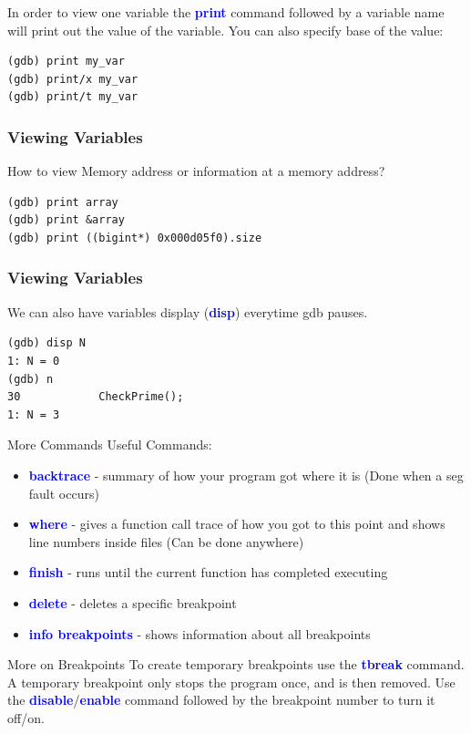 \documentclass[11pt]{beamer}
\begin{document}
\begin{frame}[fragile]
In order to view one variable the \textbf{\textcolor{blue}{print}} command followed by a variable name will print out the value of the variable. You can also specify base of the value:

\begin{lstlisting}[style=BashInputStyle]
(gdb) print my_var
(gdb) print/x my_var
(gdb) print/t my_var
\end{lstlisting}
\end{frame}

\begin{frame}[fragile]
\frametitle{Viewing Variables}

How to view Memory address or information at a memory address?
\begin{lstlisting}[style=BashInputStyle]
(gdb) print array
(gdb) print &array
(gdb) print ((bigint*) 0x000d05f0).size
\end{lstlisting} 
\end{frame}

\begin{frame}[fragile]
\frametitle{Viewing Variables}
We can also have variables display (\textbf{\textcolor{blue}{disp}}) everytime gdb pauses.
\begin{lstlisting}[style=BashInputStyle]
(gdb) disp N
1: N = 0
(gdb) n
30            CheckPrime();
1: N = 3
\end{lstlisting}
\end{frame}

\begin{frame}{More Commands}
Useful Commands:
\begin{itemize}
\item \textbf{\textcolor{blue}{backtrace}} - summary of how your program got where it is (Done when a seg fault occurs)
\item \textbf{\textcolor{blue}{where}} - gives a function call trace of how you got to this point and shows line numbers inside files (Can be done anywhere)
\item \textbf{\textcolor{blue}{finish}} - runs until the current function has completed executing
\item \textbf{\textcolor{blue}{delete}} - deletes a specific breakpoint
\item \textbf{\textcolor{blue}{info breakpoints}} - shows information about all breakpoints
\end{itemize}
\end{frame}

\begin{frame}{More on Breakpoints}
        To create temporary breakpoints use the \textbf{\textcolor{blue}{tbreak}} command. A temporary breakpoint only stops the program once, and is then removed.
        \break
        \break
        Use the \textbf{\textcolor{blue}{disable}}/\textbf{\textcolor{blue}{enable}} command followed by the breakpoint number to turn it off/on.
\end{frame}
\end{document}
